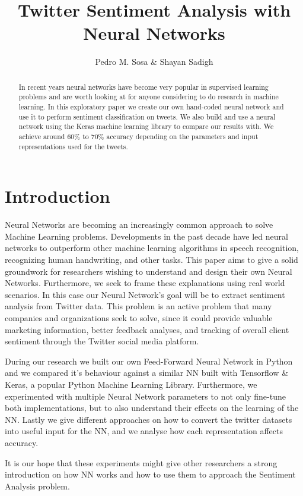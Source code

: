 \documentclass[11pt,onecolumn]{article} %
\title{Twitter Sentiment Analysis with Neural Networks}
\author{Pedro M. Sosa \& Shayan Sadigh}
\begin{document}
	
	\maketitle
	
	\begin{abstract}
		In recent years neural networks have become very popular in supervised learning problems and are worth looking at for anyone considering to do research in machine learning. In this exploratory paper we create our own hand-coded neural network and use it to perform sentiment classification on tweets. We also build and use a neural network using the Keras machine learning library to compare our results with. We achieve around 60\% to 70\% accuracy depending on the parameters and input representations used for the tweets.
	\end{abstract}
	
	\section{Introduction}
	Neural Networks are becoming an increasingly common approach to solve Machine Learning problems. Developments in the past decade have led neural networks to outperform other machine learning algorithms in speech recognition, recognizing human handwriting, and other tasks. This paper aims to give a solid groundwork for researchers wishing to understand and design their own Neural Networks. Furthermore, we seek to frame these explanations using real world scenarios. In this case our Neural Network's goal will be to extract sentiment analysis from Twitter data. This problem is an active problem that many companies and organizations seek to solve, since it could provide valuable marketing information, better feedback analyses, and tracking of overall client sentiment through the Twitter social media platform.
	
	\par During our research we built our own Feed-Forward Neural Network in Python and we compared it's behaviour against a similar NN built with Tensorflow \& Keras, a popular Python Machine Learning Library. Furthermore, we experimented with multiple Neural Network parameters to not only fine-tune both implementations, but to also understand their effects on the learning of the NN. Lastly we give different approaches on how to convert the twitter datasets into useful input for the NN, and we analyse how each representation affects accuracy. 
	\par It is our hope that these experiments might give other researchers a strong introduction on how NN works and how to use them to approach the Sentiment Analysis problem.
	
\end{document}
